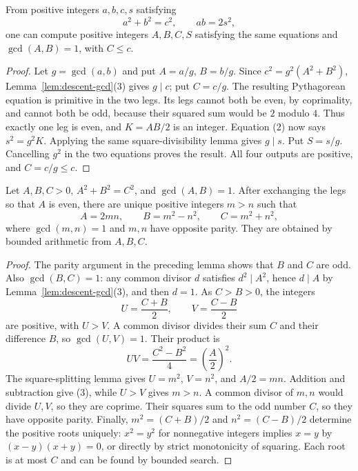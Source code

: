 \begin{lemma}\label{lem:triangle-normalize}
From positive integers $a,b,c,s$ satisfying
\[
 a^2+b^2=c^2,\qquad ab=2s^2,
 \tag{2}
\]
one can compute positive integers $A,B,C,S$ satisfying the same equations
and $\gcd(A,B)=1$, with $C\leq c$.
\end{lemma}

\begin{proof}
Let $g=\gcd(a,b)$ and put $A=a/g$, $B=b/g$.  Since
$c^2=g^2(A^2+B^2)$, Lemma~\ref{lem:descent-gcd}(3) gives $g\mid c$;
put $C=c/g$.  The resulting Pythagorean equation is primitive in the two
legs.  Its legs cannot both be even, by coprimality, and cannot both be odd,
because their squared sum would be $2$ modulo $4$.  Thus exactly one leg is
even, and $K=AB/2$ is an integer.  Equation (2) now says $s^2=g^2K$.
Applying the same square-divisibility lemma gives $g\mid s$.  Put $S=s/g$.
Cancelling $g^2$ in the two equations proves the result.  All four outputs
are positive, and $C=c/g\leq c$.
\end{proof}

\begin{lemma}\label{lem:pythagorean-descent}
Let $A,B,C>0$, $A^2+B^2=C^2$, and $\gcd(A,B)=1$.  After exchanging the legs
so that $A$ is even, there are unique positive integers $m>n$ such that
\[
 A=2mn,\qquad B=m^2-n^2,\qquad C=m^2+n^2,
 \tag{3}
\]
where $\gcd(m,n)=1$ and $m,n$ have opposite parity.  They are obtained by
bounded arithmetic from $A,B,C$.
\end{lemma}

\begin{proof}
The parity argument in the preceding lemma shows that $B$ and $C$ are odd.
Also $\gcd(B,C)=1$: any common divisor $d$ satisfies $d^2\mid A^2$, hence
$d\mid A$ by Lemma~\ref{lem:descent-gcd}(3), and then $d=1$.
As $C>B>0$, the integers
\[
 U=\frac{C+B}{2},\qquad V=\frac{C-B}{2}
\]
are positive, with $U>V$.  A common divisor divides their sum $C$ and their
difference $B$, so $\gcd(U,V)=1$.  Their product is
\[
 UV=\frac{C^2-B^2}{4}=\left(\frac A2\right)^2.
\]
The square-splitting lemma gives $U=m^2$, $V=n^2$, and $A/2=mn$.
Addition and subtraction give (3), while $U>V$ gives $m>n$.
A common divisor of $m,n$ would divide $U,V$, so they are coprime.
Their squares sum to the odd number $C$, so they have opposite parity.
Finally, $m^2=(C+B)/2$ and $n^2=(C-B)/2$ determine the positive roots
uniquely: $x^2=y^2$ for nonnegative integers implies $x=y$ by
$(x-y)(x+y)=0$, or directly by strict monotonicity of squaring.
Each root is at most $C$ and can be found by bounded search.
\end{proof}

